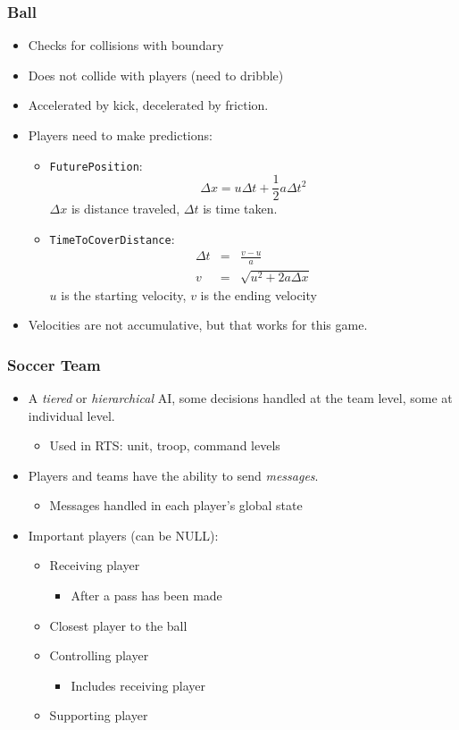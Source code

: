\documentclass[handout,t,compress]{beamer}
\newcommand{\bframe}[1]{\begin{frame}[fragile]\frametitle{#1}}
\newcommand{\bi}{\begin{itemize}}
\newcommand{\li}{\item}
\newcommand{\ei}{\end{itemize}}
\begin{document}
\bframe{Ball}
\begin{itemize}
\item Checks for collisions with boundary
\item Does not collide with players (need to dribble)
\item Accelerated by kick, decelerated by friction. 
\item Players need to make predictions:
\begin{itemize}
\item {\tt FuturePosition}:
\[
\Delta x = u\Delta t + \frac{1}{2}a\Delta t^2
\]
 $\Delta x$ is
  distance traveled, $\Delta t$ is time taken.
\item {\tt TimeToCoverDistance}:
\begin{eqnarray*}
\Delta t &=& \frac{v-u}{a}\\
v &=& \sqrt{u^2 + 2a\Delta x}
\end{eqnarray*}
$u$ is the starting velocity, $v$ is the ending velocity
\end{itemize}
\item Velocities are not accumulative, but that works for this game.
\end{itemize}

\end{frame}

\bframe{Soccer Team}
\begin{itemize}
\item A {\em tiered} or {\em hierarchical} AI, some decisions handled
  at the team level, some at individual level.
\begin{itemize}
\item Used in RTS: unit, troop, command levels
\end{itemize}
\item Players and teams have the ability to send {\em messages}.
\bi\li Messages handled in each player's global state\ei
\item Important players (can be NULL):
\begin{itemize}
\item Receiving player
\bi\li After a pass has been made\ei
\item Closest player to the ball
\item Controlling player
\bi\li Includes receiving player\ei
\item Supporting player
\end{itemize}
\end{itemize}
\end{frame}
\end{document}
